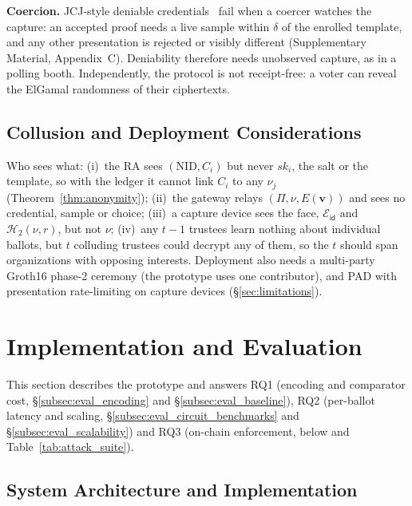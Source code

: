 \documentclass[10pt,letterpaper,journal]{IEEEtran}
\begin{document}
\textbf{Coercion.}\label{sec:coercion} JCJ-style deniable credentials~\cite{Juels2005,Civitas2008} fail when a coercer watches the capture: an accepted proof needs a live sample within $\delta$ of the enrolled template, and any other presentation is rejected or visibly different (Supplementary Material, Appendix~C). Deniability therefore needs unobserved capture, as in a polling booth. Independently, the protocol is not receipt-free: a voter can reveal the ElGamal randomness of their ciphertexts.

\subsection{Collusion and Deployment Considerations}
\label{sec:collusion}\label{sec:gaps}
Who sees what: (i)~the RA sees $(\text{NID}, C_i)$ but never $sk_i$, the salt or the template, so with the ledger it cannot link $C_i$ to any $\nu_j$ (Theorem~\ref{thm:anonymity}); (ii)~the gateway relays $(\Pi, \nu, E(\mathbf{v}))$ and sees no credential, sample or choice; (iii)~a capture device sees the face, $\mathcal{E}_{\mathsf{id}}$ and $\mathcal{H}_2(\nu, r)$, but not $\nu$; (iv)~any $t-1$ trustees learn nothing about individual ballots, but $t$ colluding trustees could decrypt any of them, so the $t$ should span organizations with opposing interests. Deployment also needs a multi-party Groth16 phase-2 ceremony (the prototype uses one contributor), and PAD with presentation rate-limiting on capture devices (\S\ref{sec:limitations}).

\section{Implementation and Evaluation}
\label{sec:implementation_and_evaluation}

This section describes the prototype and answers RQ1 (encoding and comparator cost, \S\ref{subsec:eval_encoding} and \S\ref{subsec:eval_baseline}), RQ2 (per-ballot latency and scaling, \S\ref{subsec:eval_circuit_benchmarks} and \S\ref{subsec:eval_scalability}) and RQ3 (on-chain enforcement, below and Table~\ref{tab:attack_suite}).

\subsection{System Architecture and Implementation}
\end{document}
